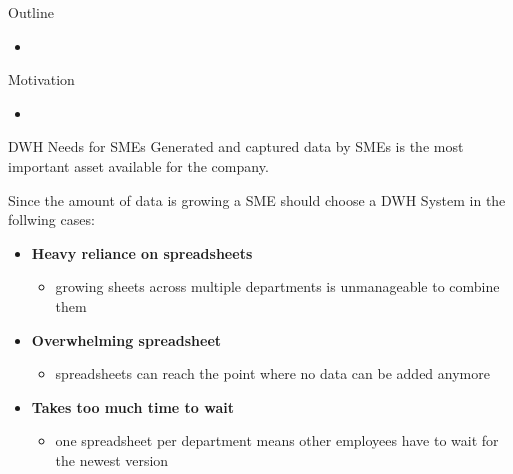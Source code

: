 \documentclass[aspectratio=169]{beamer}
\begin{document}
  \maketitle
  
   \begin{frame}{Outline}
    \begin{itemize}
      \item
    \end{itemize}
  \end{frame}
  
  \begin{frame}{Motivation}
    \begin{itemize}
      \item
    \end{itemize}
  \end{frame}
  
  \begin{frame}{DWH Needs for SMEs}
    Generated and captured data by SMEs is the most important asset available for the company.

Since the amount of data is growing a SME should choose a DWH System in the follwing cases:
    \begin{itemize}
      \item \textbf{Heavy reliance on spreadsheets}
      	\begin{itemize}
      	   \item growing sheets across multiple departments is unmanageable to combine them
      	\end{itemize}
      \item \textbf{Overwhelming spreadsheet}
		\begin{itemize}
		   \item spreadsheets can reach the point where no data can be added anymore
      	\end{itemize}
      \item \textbf{Takes too much time to wait}
      	\begin{itemize}
      	   \item one spreadsheet per department means other employees have to wait for the newest version
      	\end{itemize}
    \end{itemize}
  \end{frame}
  
\end{document}

